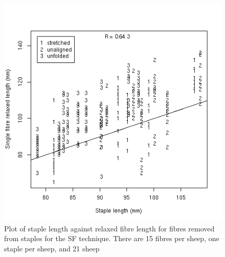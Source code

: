%

\begin{figure}[!h]
  \centering
  \includegraphics[width=1.0\textwidth]{figLrLs.png}
  \caption{Plot of staple length against relaxed fibre length for fibres removed from staples for the SF technique. There are 15 fibres per sheep, one staple per sheep, and 21 sheep}
\label{fig:LrLs}
\end{figure}

%


